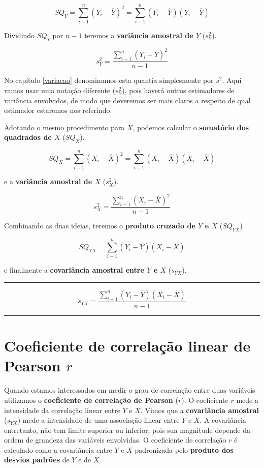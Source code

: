 \documentclass[
]{book}
\begin{document}
\[SQ_Y = \sum_{i-1}^{n} (Y_i - \overline{Y})^2 = \sum_{i-1}^{n}(Y_i - \overline{Y}) (Y_i - \overline{Y})\]

Dividindo \(SQ_Y\) por \(n-1\) teremos a \textbf{variância amostral de \(Y\)} (\(s^2_Y\)).

\[s^2_Y = \frac{\sum_{i-1}^{n} (Y_i - \overline{Y})^2}{n-1}\]

No capítulo \ref{variacao} denominamos esta quantia simplesmente por \(s^2\). Aqui vamos usar uma notação diferente (\(s^2_Y\)), pois haverá outros estimadores de variância envolvidos, de modo que deveremos ser mais claros a respeito de qual estimador estaremos nos referindo.

Adotando o mesmo procedimento para \(X\), podemos calcular o \textbf{somatório dos quadrados de \(X\)} (\(SQ_X\)).

\[SQ_X = \sum_{i-1}^{n} (X_i - \overline{X})^2 = \sum_{i-1}^{n}(X_i - \overline{X}) (X_i - \overline{X})\]

e a \textbf{variância amostral de \(X\)} (\(s^2_X\)).

\[s^2_X = \frac{\sum_{i-1}^{n} (X_i - \overline{X})^2}{n-1}\]

Combinando as duas ideias, teremos o \textbf{produto cruzado de \(Y\) e \(X\)} (\(SQ_{YX}\))

\[SQ_{YX} = \sum_{i-1}^{n}(Y_i - \overline{Y}) (X_i - \overline{X})\]

e finalmente a \textbf{covariância amostral entre \(Y\) e \(X\)} (\(s_{YX}\)).

\begin{center}\rule{0.5\linewidth}{0.5pt}\end{center}

\[s_{YX} = \frac{\sum_{i-1}^{n}(Y_i - \overline{Y}) (X_i - \overline{X})}{n-1}\]

\begin{center}\rule{0.5\linewidth}{0.5pt}\end{center}

\hypertarget{coeficiente-de-correlauxe7uxe3o-linear-de-pearson-r}{%
\section{\texorpdfstring{Coeficiente de correlação linear de Pearson \(r\)}{Coeficiente de correlação linear de Pearson r}}\label{coeficiente-de-correlauxe7uxe3o-linear-de-pearson-r}}

Quando estamos interessados em medir o grau de correlação entre duas variáveis utilizamos o \textbf{coeficiente de correlação de Pearson} (\textbf{\(r\)}). O coeficiente \(r\) mede a intensidade da correlação linear entre \(Y\) e \(X\). Vimos que a \textbf{covariância amostral} (\(s_{YX}\)) mede a intensidade de uma associação linear entre \(Y\) e \(X\). A covariância entretanto, não tem limite superior ou inferior, pois sua magnitude depende da ordem de grandeza das variáveis envolvidas. O coeficiente de correlação \(r\) é calculado como a covariância entre \(Y\) e \(X\) padronizada pelo \textbf{produto dos desvios padrões} de \(Y\) e de \(X\).
\end{document}
